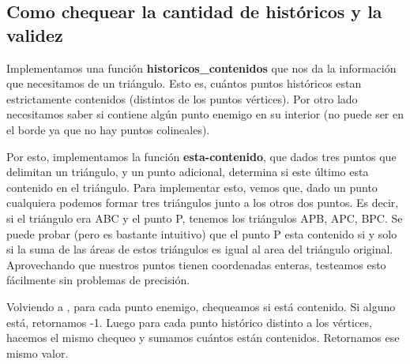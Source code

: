 \subsection{Como chequear la cantidad de históricos y la validez}
\par{Implementamos una función \textbf{historicos_contenidos} que nos da la información que necesitamos de un triángulo. Esto es, cuántos puntos históricos estan estrictamente contenidos (distintos de los puntos vértices). Por otro lado necesitamos saber si contiene algún punto enemigo en su interior (no puede ser en el borde ya que no hay puntos colineales). } \newline
\par{Por esto, implementamos la función \textbf{esta-contenido}, que dados tres puntos que delimitan un triángulo, y un punto adicional, determina si este último esta contenido en el triángulo. Para implementar esto, vemos que, dado un punto cualquiera podemos formar tres triángulos junto a los otros dos puntos. 
Es decir, si el triángulo era ABC y el punto P, tenemos los triángulos APB, APC, BPC. Se puede probar (pero es bastante intuitivo) que el punto P esta contenido si y solo si
la suma de las áreas de estos triángulos es igual al area del triángulo original. Aprovechando que nuestros puntos tienen coordenadas enteras, testeamos esto fácilmente sin problemas de precisión.} \newline

\par{Volviendo a , para cada punto enemigo, chequeamos si está contenido. Si alguno está, retornamos -1. Luego para cada punto histórico distinto a los vértices, hacemos el mismo chequeo y sumamos cuántos están contenidos. Retornamos ese mismo valor.} \newline

